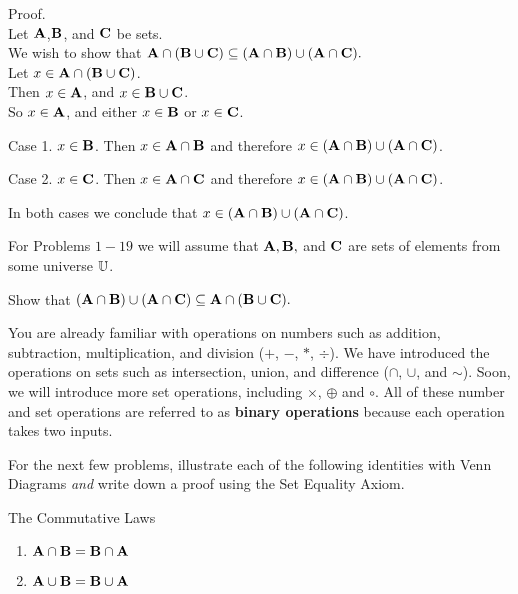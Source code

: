 \begin{expl}
\begin{annotation}
{   \noindent
   \textsf{Proof.}\\
   Let $\mathbf A$,$\mathbf B$, and $\mathbf C$ be sets.\\
   We wish to show that $\mathbf A \cap (\mathbf B \cup \mathbf C) \subseteq (\mathbf A \cap \mathbf B) \cup (\mathbf A \cap \mathbf C).$\\
   Let $x \in \mathbf A \cap (\mathbf B \cup \mathbf C)$. \\
   Then $x \in \mathbf A$, and $x \in \mathbf B \cup \mathbf C$.\\
   So $x \in \mathbf A$, and either $x \in \mathbf B$ or $x \in \mathbf C$.
   \begin{description}
   \item{Case 1.} $x \in \mathbf B$. Then $x \in \mathbf A \cap \mathbf B$ and therefore $x
   \in (\mathbf A \cap \mathbf B) \cup (\mathbf A\cap \mathbf C)$.
   \item{Case 2.} $x \in \mathbf C$. Then $x \in \mathbf A \cap \mathbf C$ and therefore $x
   \in (\mathbf A \cap \mathbf B) \cup (\mathbf A \cap \mathbf C)$.
   \end{description}

   \nin In both cases we conclude that $x \in (\mathbf A \cap \mathbf B) \cup (\mathbf A  \cap \mathbf C)$.}
\end{annotation}
\end{expl}

For Problems $1 - 19$ we will assume that $\mathbf A, \mathbf B,$ and $\mathbf C$ are sets of elements from some universe $\mathbb U$.
    \begin{prb}
    \label{pp}
     Show that $(\mathbf A \cap \mathbf B) \cup (\mathbf A \cap \mathbf C) \subseteq \mathbf A \cap (\mathbf B \cup \mathbf C).$
    \end{prb}


\nin You are already familiar with operations on numbers such as addition, subtraction, multiplication, and division ($+$, $-$, $*$, $\div$).
We have introduced the operations on sets such as intersection, union, and difference ($\cap$, $\cup$, and $\sim$).  Soon, we will
introduce more set operations, including $\times$, $\oplus$ and $\circ$.  All of these number and set operations are referred to as
\textbf{binary operations} because each operation takes two inputs.

\bigskip

For the next few problems, illustrate each of the following identities with Venn Diagrams \emph{and} write down a proof
using the Set Equality Axiom.

\begin{prb}
The Commutative Laws
\begin{enumerate}
\item $\mathbf A \cap \mathbf B = \mathbf B \cap \mathbf A$
\item $\mathbf A \cup \mathbf B = \mathbf B \cup \mathbf A$
\end{enumerate}
\end{prb}

